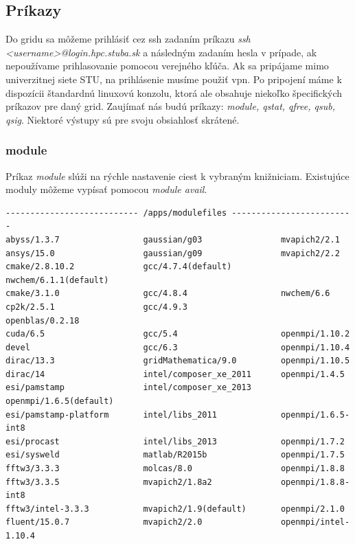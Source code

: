 \subsection{Príkazy}
Do gridu sa môžeme prihlásiť cez \acrshort{ssh} zadaním príkazu \textit{ssh <username>@login.hpc.stuba.sk} a následným zadaním hesla v prípade,
ak nepoužívame prihlasovanie pomocou verejného kľúča.
Ak sa pripájame mimo univerzitnej siete STU, na prihlásenie musíme použiť \acrshort{vpn}.
Po pripojení máme k dispozícii štandardnú linuxovú konzolu, ktorá ale obsahuje niekoľko špecifických príkazov pre daný grid.
Zaujímať nás budú príkazy: \textit{module, qstat, qfree, qsub, qsig}.
Niektoré výstupy sú pre svoju obsiahlosť skrátené.

\subsubsection{module}
\label{kap:module}
Príkaz \textit{module} slúži na rýchle nastavenie ciest k vybraným knižniciam.
Existujúce moduly môžeme vypísať pomocou \textit{module avail}.

\begin{lstlisting}[caption={module avail}]
--------------------------- /apps/modulefiles -------------------------
abyss/1.3.7                 gaussian/g03                mvapich2/2.1
ansys/15.0                  gaussian/g09                mvapich2/2.2
cmake/2.8.10.2              gcc/4.7.4(default)          nwchem/6.1.1(default)
cmake/3.1.0                 gcc/4.8.4                   nwchem/6.6
cp2k/2.5.1                  gcc/4.9.3                   openblas/0.2.18
cuda/6.5                    gcc/5.4                     openmpi/1.10.2
devel                       gcc/6.3                     openmpi/1.10.4
dirac/13.3                  gridMathematica/9.0         openmpi/1.10.5
dirac/14                    intel/composer_xe_2011      openmpi/1.4.5
esi/pamstamp                intel/composer_xe_2013      openmpi/1.6.5(default)
esi/pamstamp-platform       intel/libs_2011             openmpi/1.6.5-int8
esi/procast                 intel/libs_2013             openmpi/1.7.2
esi/sysweld                 matlab/R2015b               openmpi/1.7.5
fftw3/3.3.3                 molcas/8.0                  openmpi/1.8.8
fftw3/3.3.5                 mvapich2/1.8a2              openmpi/1.8.8-int8
fftw3/intel-3.3.3           mvapich2/1.9(default)       openmpi/2.1.0
fluent/15.0.7               mvapich2/2.0                openmpi/intel-1.10.4
\end{lstlisting}

